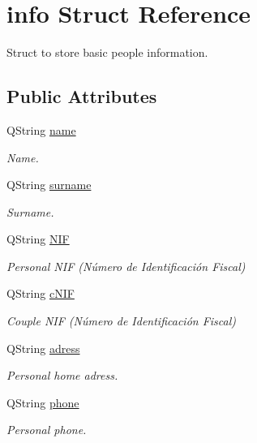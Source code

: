 \hypertarget{structinfo}{\section{info Struct Reference}
\label{structinfo}
}


Struct to store basic people information.  


\subsection*{Public Attributes}
\begin{DoxyCompactItemize}
\item 
Q\+String \hyperlink{structinfo_a27cfacf228447e06d83abd01882eb78d}{name}
\begin{DoxyCompactList}\small\item\em Name. \end{DoxyCompactList}\item 
Q\+String \hyperlink{structinfo_a9dd9f00d6b74f1d7b4519e509efd0031}{surname}
\begin{DoxyCompactList}\small\item\em Surname. \end{DoxyCompactList}\item 
Q\+String \hyperlink{structinfo_a68e2c3e3e7e8e6df17e1f5b466506319}{N\+I\+F}
\begin{DoxyCompactList}\small\item\em Personal N\+I\+F (Número de Identificación Fiscal) \end{DoxyCompactList}\item 
Q\+String \hyperlink{structinfo_a46ee4d6a7e5976d795ed9efa02341fce}{c\+N\+I\+F}
\begin{DoxyCompactList}\small\item\em Couple N\+I\+F (Número de Identificación Fiscal) \end{DoxyCompactList}\item 
Q\+String \hyperlink{structinfo_a589dff7ad548e9ac9a45f632539c9a0a}{adress}
\begin{DoxyCompactList}\small\item\em Personal home adress. \end{DoxyCompactList}\item 
Q\+String \hyperlink{structinfo_a716fe5520eb096be308dcd18f7cbd1c1}{phone}
\begin{DoxyCompactList}\small\item\em Personal phone. \end{DoxyCompactList}\item 

\end{DoxyCompactItemize}
